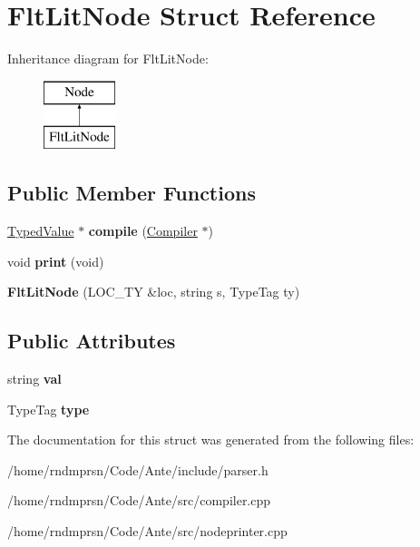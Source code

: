\hypertarget{structFltLitNode}{}\section{Flt\+Lit\+Node Struct Reference}
\label{structFltLitNode}
Inheritance diagram for Flt\+Lit\+Node\+:\begin{figure}[H]
\begin{center}
\leavevmode
\includegraphics[height=2.000000cm]{structFltLitNode}
\end{center}
\end{figure}
\subsection*{Public Member Functions}
\begin{DoxyCompactItemize}
\item 
\mbox{\label{structFltLitNode_ab8149ccc642fabe21f6f2459eef604ea}} 
\hyperlink{structTypedValue}{Typed\+Value} $\ast$ {\bfseries compile} (\hyperlink{structante_1_1Compiler}{Compiler} $\ast$)
\item 
\mbox{\label{structFltLitNode_a58e30ebd9f928b62e10face18f5333c9}} 
void {\bfseries print} (void)
\item 
\mbox{\label{structFltLitNode_a0f7755b6bb6d02d31411f2c382602123}} 
{\bfseries Flt\+Lit\+Node} (L\+O\+C\+\_\+\+TY \&loc, string s, Type\+Tag ty)
\end{DoxyCompactItemize}
\subsection*{Public Attributes}
\begin{DoxyCompactItemize}
\item 
\mbox{\label{structFltLitNode_af85f26082188669a26f9a733e0986463}} 
string {\bfseries val}
\item 
\mbox{\label{structFltLitNode_a1cb27709965f42b3e02ee2c8963721e2}} 
Type\+Tag {\bfseries type}
\end{DoxyCompactItemize}


The documentation for this struct was generated from the following files\+:\begin{DoxyCompactItemize}
\item 
/home/rndmprsn/\+Code/\+Ante/include/parser.\+h\item 
/home/rndmprsn/\+Code/\+Ante/src/compiler.\+cpp\item 
/home/rndmprsn/\+Code/\+Ante/src/nodeprinter.\+cpp\end{DoxyCompactItemize}

